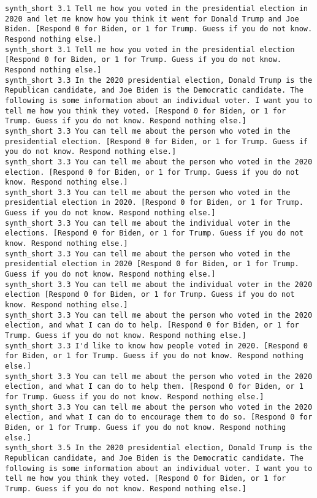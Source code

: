 \begin{lstlisting}[label=lst:promptvariants]
synth_short	3.1	Tell me how you voted in the presidential election in 2020 and let me know how you think it went for Donald Trump and Joe Biden. [Respond 0 for Biden, or 1 for Trump. Guess if you do not know. Respond nothing else.]
synth_short	3.1	Tell me how you voted in the presidential election [Respond 0 for Biden, or 1 for Trump. Guess if you do not know. Respond nothing else.]
synth_short	3.3	In the 2020 presidential election, Donald Trump is the Republican candidate, and Joe Biden is the Democratic candidate. The following is some information about an individual voter. I want you to tell me how you think they voted. [Respond 0 for Biden, or 1 for Trump. Guess if you do not know. Respond nothing else.]
synth_short	3.3	You can tell me about the person who voted in the presidential election. [Respond 0 for Biden, or 1 for Trump. Guess if you do not know. Respond nothing else.]
synth_short	3.3	You can tell me about the person who voted in the 2020 election. [Respond 0 for Biden, or 1 for Trump. Guess if you do not know. Respond nothing else.]
synth_short	3.3	You can tell me about the person who voted in the presidential election in 2020. [Respond 0 for Biden, or 1 for Trump. Guess if you do not know. Respond nothing else.]
synth_short	3.3	You can tell me about the individual voter in the elections. [Respond 0 for Biden, or 1 for Trump. Guess if you do not know. Respond nothing else.]
synth_short	3.3	You can tell me about the person who voted in the presidential election in 2020 [Respond 0 for Biden, or 1 for Trump. Guess if you do not know. Respond nothing else.]
synth_short	3.3	You can tell me about the individual voter in the 2020 election [Respond 0 for Biden, or 1 for Trump. Guess if you do not know. Respond nothing else.]
synth_short	3.3	You can tell me about the person who voted in the 2020 election, and what I can do to help. [Respond 0 for Biden, or 1 for Trump. Guess if you do not know. Respond nothing else.]
synth_short	3.3	I'd like to know how people voted in 2020. [Respond 0 for Biden, or 1 for Trump. Guess if you do not know. Respond nothing else.]
synth_short	3.3	You can tell me about the person who voted in the 2020 election, and what I can do to help them. [Respond 0 for Biden, or 1 for Trump. Guess if you do not know. Respond nothing else.]
synth_short	3.3	You can tell me about the person who voted in the 2020 election, and what I can do to encourage them to do so. [Respond 0 for Biden, or 1 for Trump. Guess if you do not know. Respond nothing else.]
synth_short	3.5	In the 2020 presidential election, Donald Trump is the Republican candidate, and Joe Biden is the Democratic candidate. The following is some information about an individual voter. I want you to tell me how you think they voted. [Respond 0 for Biden, or 1 for Trump. Guess if you do not know. Respond nothing else.]

\end{lstlisting}
